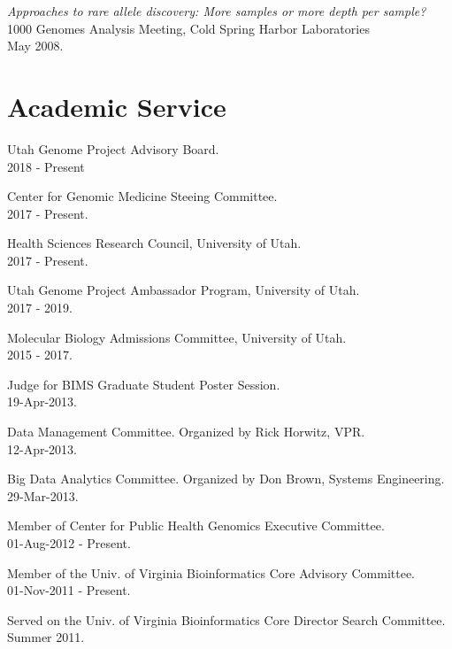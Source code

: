 \documentclass[margin,line]{cv}
\begin{document}
\begin{resume}
    \textit{Approaches to rare allele discovery: More samples or more depth per sample? } \\
    1000 Genomes Analysis Meeting, Cold Spring Harbor Laboratories \\
    May 2008.

    \section{\mysidestyle Academic Service}


    Utah Genome Project Advisory Board. \\
    2018 - Present

    Center for Genomic Medicine Steeing Committee. \\
    2017 - Present.

    Health Sciences Research Council, University of Utah. \\
    2017 - Present.

    Utah Genome Project Ambassador Program, University of Utah. \\
    2017 - 2019.

    Molecular Biology Admissions Committee, University of Utah. \\
    2015 - 2017.

    Judge for BIMS Graduate Student Poster Session. \\
    19-Apr-2013.

    Data Management Committee. Organized by Rick Horwitz, VPR.\\
    12-Apr-2013.

    Big Data Analytics Committee. Organized by Don Brown, Systems Engineering.\\
    29-Mar-2013.

    Member of Center for Public Health Genomics Executive Committee.\\
    01-Aug-2012 - Present.

    \vspace{-2mm}
    Member of the Univ. of Virginia Bioinformatics Core Advisory Committee.\\
    01-Nov-2011 - Present.

    \vspace{-2mm}
    Served on the Univ. of Virginia Bioinformatics Core Director Search Committee. \\
    Summer 2011.




\end{resume}
\end{document}

